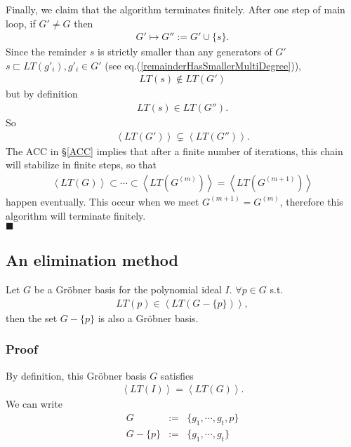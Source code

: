 \documentclass[11pt]{book}
\begin{document}
Finally, we claim that the algorithm terminates finitely.
After one step of main loop, if $G' \neq G$ then 
\begin{eqnarray}
G' \mapsto G'' := G' \cup \{s \}.
\end{eqnarray}
Since the reminder $s$ is strictly smaller than any generators of $G'$ $s \sqsubset LT(g'_i), g'_i \in G'$ (see eq.(\ref{remainderHasSmallerMultiDegree})),
\begin{eqnarray}
LT(s) \notin LT(G')
\end{eqnarray}
but by definition
\begin{eqnarray}
LT(s) \in LT(G'').
\end{eqnarray}
So
\begin{eqnarray}
\left<LT(G') \right> \subsetneq \left<LT(G'') \right>.
\end{eqnarray}
The ACC in \S\ref{ACC} implies that after a finite number of iterations, this chain will stabilize in finite steps, so that
\begin{eqnarray}
\left<LT(G) \right> \subset \cdots \subset \left<LT(G^{(m)}) \right> = \left<LT(G^{(m+1)}) \right>
\end{eqnarray}
happen eventually.
This occur when we meet $G^{(m+1)} = G^{(m)}$, therefore this algorithm will terminate finitely.\\
$\blacksquare$

\subsection{An elimination method}
Let $G$ be a Gr\"obner basis for the polynomial ideal $I$.
$\forall p \in G$ s.t. 
\begin{eqnarray}
LT(p) \in \left< LT(G - \{p\}) \right>,
\end{eqnarray}
then the set $G - \{p\}$ is also a Gr\"obner basis.

\subsubsection{Proof}
By definition, this Gr\"obner basis $G$ satisfies
\begin{eqnarray}
\left<LT(I)\right> = \left<LT(G) \right>.
\end{eqnarray}
We can write
\begin{eqnarray}
G &:=& \{g_1, \cdots, g_t, p\} \\
G - \{p\} &:=& \{g_1, \cdots, g_t\}
\end{eqnarray}
\end{document}

